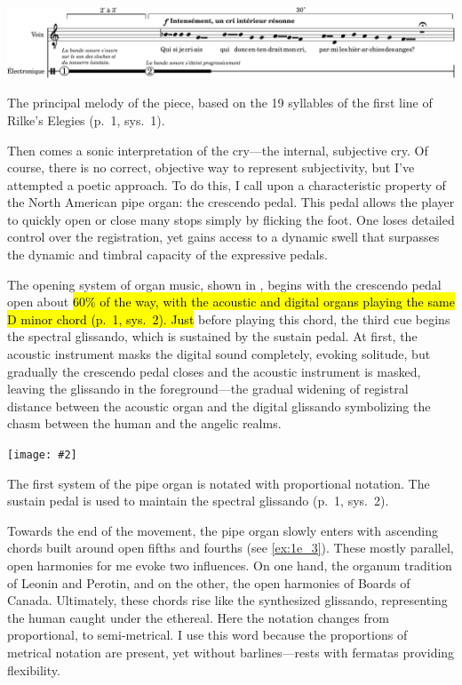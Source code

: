 \documentclass[12pt,twoside,maitrise]{dms_ks}
\newcommand{\customincludeexamples}[4][]{%
    \begin{example}[H]
        \centering
        \texttt{[image: \#2]}
        \caption{#4}
	\label{#3} 
    \end{example}
}
\theoremstyle{definition}
\begin{document}
{%

\begin{example}[H]
    \centering
    \includegraphics[width=\textwidth]{1e_1}
    \caption{The principal melody of the piece, based on the 19 syllables of the first line of Rilke's Elegies (p.~1, sys.~1)\protect\footnotemark.}
    \label{ex:1e_1}
\end{example}


Then comes a sonic interpretation of the cry---the internal, subjective cry.
Of course, there is no correct, objective way to represent subjectivity, but I've attempted a poetic approach.
To do this, I call upon a characteristic property of the North American pipe organ: the crescendo pedal.
This pedal allows the player to quickly open or close many stops simply by flicking the foot.
One loses detailed control over the registration, yet gains access to a dynamic swell that surpasses the dynamic and timbral capacity of the expressive pedals.

The opening system of organ music, shown in , begins with the crescendo pedal open about \hl{60\% of the way, with the acoustic and digital organs playing the same D minor chord (p.~1, sys.~2).
Just} before playing this chord, the third cue begins the spectral glissando, which is sustained by the sustain pedal.
At first, the acoustic instrument masks the digital sound completely, evoking solitude, but gradually the crescendo pedal closes and the acoustic instrument is masked, leaving the glissando in the foreground---the gradual widening of registral distance between the acoustic organ and the digital glissando symbolizing the chasm between the human and the angelic realms.

\customincludeexamples[width=\textwidth]{1e_2}{ex:1e_2}{The first system of the pipe organ is notated with proportional notation. The sustain pedal is used to maintain the spectral glissando (p.~1, sys.~2).}

Towards the end of the movement, the pipe organ slowly enters with ascending chords built around open fifths and fourths (see \cref{ex:1e_3}).
These mostly parallel, open harmonies for me evoke two influences.
On one hand, the organum tradition of Leonin and Perotin, and on the other, the open harmonies of Boards of Canada.
Ultimately, these chords rise like the synthesized glissando, representing the human caught under the ethereal.
Here the notation changes from proportional, to semi-metrical.
I use this word because the proportions of metrical notation are present, yet without barlines---rests with fermatas providing flexibility.

}
\end{document}
